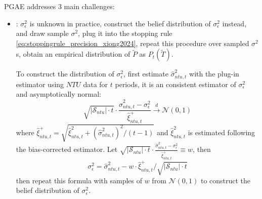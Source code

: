 \documentclass[twoside]{article}
\begin{document}
PGAE addresses 3 main challenges:
\begin{itemize}
    \item {}: $\sigma^2_{\epsilon}$ is unknown in practice, construct the belief distribution of $\sigma^2_{\epsilon}$ instead, and draw sample $\sigma^2$, plug it into the stopping rule \ref{eq:stoppingrule_precision_xiong2024}, repeat this procedure over sampled $\sigma^2$s, obtain an empirical distribution of $\tilde{P}$ as $P_t(\tilde{T})$.
    
    To construct the distribution of $\sigma^2_{\epsilon}$, first estimate $\hat{\sigma}^2_{ntu,t}$ with the plug-in estimator using $NTU$ data for $t$ periods, it is an consistent estimator of $\sigma^2_{\epsilon}$ and asymptotically normal: $$ \sqrt{\left\vert \mathcal{S}_{ntu}\right\vert\cdot t} \cdot \frac{\hat{\sigma}^2_{ntu,t}-\sigma^2_{\epsilon}}{\hat{\xi}^{+}_{ntu,t}} \xrightarrow{d} \mathcal{N}(0,1) $$
    where $\hat{\xi}^+_{ntu,t} = \sqrt{\hat{\xi}^2_{ntu,t}+\left(\hat{\sigma}^2_{ntu,t}\right)^2/(t-1)} $ and $\hat{\xi}^2_{ntu,t}$ is estimated following the bias-corrected estimator. Let $\sqrt{\left\vert \mathcal{S}_{ntu}\right\vert\cdot t} \cdot \frac{\hat{\sigma}^2_{ntu,t}-\sigma^2_{\epsilon}}{\hat{\xi}^{+}_{ntu,t}}\equiv w$, then $$ \sigma^2_{\epsilon} = \hat{\sigma}^2_{ntu,t}-w \cdot \hat{\xi}^+_{ntu,t}/\sqrt{\left\vert \mathcal{S}_{ntu}\right\vert\cdot t}$$
    then repeat this formula with samples of $w$ from $\mathcal{N}(0,1)$ to construct the belief distribution of $\sigma^2_{\epsilon}$. 


\end{itemize}
\end{document}
